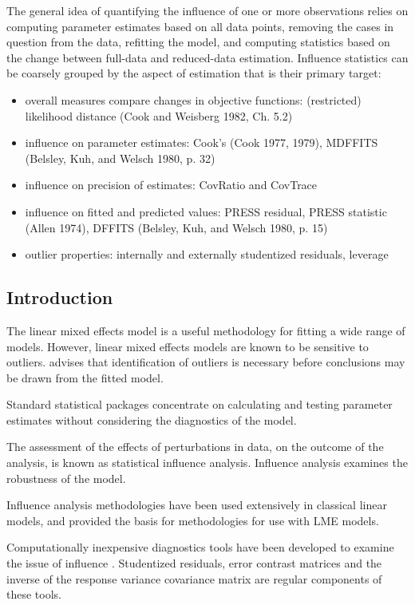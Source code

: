 \documentclass[12pt, a4paper]{report}
\theoremstyle{plain}
\theoremstyle{definition}
\theoremstyle{remark}
\begin{document}
The general idea of quantifying the influence of one or more observations relies on computing parameter estimates based on all data points, removing the cases in question from the data, refitting the model, and computing statistics based on the change between full-data and reduced-data estimation. Influence statistics can be coarsely grouped by the aspect of estimation that is their primary target:
\begin{itemize}
	\item overall measures compare changes in objective functions: (restricted) likelihood distance (Cook and Weisberg 1982, Ch. 5.2)
	\item influence on parameter estimates: Cook's  (Cook 1977, 1979), MDFFITS (Belsley, Kuh, and Welsch 1980, p. 32)
	\item influence on precision of estimates: CovRatio and CovTrace
	\item influence on fitted and predicted values: PRESS residual, PRESS statistic (Allen 1974), DFFITS (Belsley, Kuh, and Welsch 1980, p. 15)
	\item outlier properties: internally and externally studentized residuals, leverage
\end{itemize}

\subsection{Introduction }
The linear mixed effects model is a useful methodology for fitting a wide range of models. However, linear mixed effects models are known to be sensitive to outliers. \citet{christensen} advises that identification of outliers is necessary before conclusions may be drawn from the fitted model.

Standard statistical packages concentrate on calculating and testing parameter estimates without considering the diagnostics of the model.

The assessment of the effects of perturbations in data, on the outcome of the analysis, is known as statistical influence analysis. Influence analysis examines the robustness of the model.

Influence analysis methodologies have been used extensively in classical linear models, and provided the basis for methodologies for use with LME models.

Computationally inexpensive diagnostics tools have been developed to examine the issue of influence \citep{tewomir}.
Studentized residuals, error contrast matrices and the inverse of the response variance covariance matrix are regular components of these tools.
\end{document}
